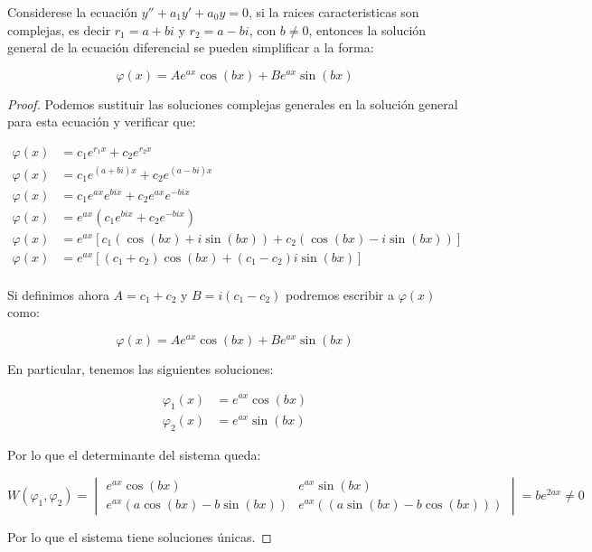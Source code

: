 		\begin{observacion}
			Considerese la ecuación $y'' + a_1 y' + a_0 y = 0$, si la raices caracteristicas son complejas, es decir $r_1 = a + b i$ y $r_2 = a - b i$, con $b \ne 0$, entonces la solución general de la ecuación diferencial se pueden simplificar a la forma:

			\begin{equation*}
				\varphi(x) = A e^{a x} \cos{(b x)} + B e^{a x} \sin{(b x)}
			\end{equation*}
		\end{observacion}

		\begin{proof}
			Podemos sustituir las soluciones complejas generales en la solución general para esta ecuación y verificar que:

			\begin{align*}
				\varphi(x) &= c_1 e^{r_1 x} + c_2 e^{r_2 x} \\
				\varphi(x) &= c_1 e^{(a + b i) x} + c_2 e^{(a - b i) x} \\
				\varphi(x) &= c_1 e^{a x} e^{bi x} + c_2 e^{a x} e^{-bi x} \\
				\varphi(x) &= e^{ax} (c_1 e^{bi x} + c_2 e^{-bi x}) \\
				\varphi(x) &= e^{ax} \left[ c_1 (\cos{(bx)} + i \sin{(bx)}) + c_2 (\cos{(bx)} - i \sin{(bx)}) \right] \\
				\varphi(x) &= e^{ax} \left[ (c_1 + c_2) \cos{(bx)} + (c_1 - c_2) i \sin{(bx)} \right] \\
			\end{align*}

			Si definimos ahora $A = c_1 + c_2$ y $B = i(c_1 - c_2)$ podremos escribir a $\varphi(x)$ como:

			\begin{equation*}
				\varphi(x) = A e^{ax} \cos{(b x)} + B e^{a x} \sin{(b x)}
			\end{equation*}

			En particular, tenemos las siguientes soluciones:

			\begin{align*}
				\varphi_1(x) &= e^{ax} \cos{(b x)} \\
				\varphi_2(x) &= e^{ax} \sin{(b x)}
			\end{align*}

			Por lo que el determinante del sistema queda:

			\begin{equation*}
				W(\varphi_1, \varphi_2) =
				\begin{vmatrix}
					e^{a x} \cos{(b x)} & e^{a x} \sin{(b x)} \\
					e^{a x} (a\cos{(b x)} - b \sin{(b x)}) & e^{a x} ((a\sin{(b x)} - b \cos{(b x)}))
				\end{vmatrix} = b e^{2 a x} \ne 0
			\end{equation*}

			Por lo que el sistema tiene soluciones únicas.
		\end{proof}

